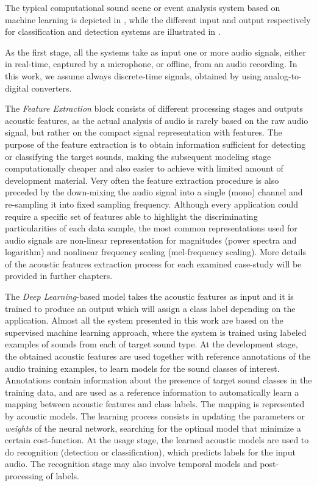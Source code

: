 The typical computational sound scene
or event analysis system based on machine learning is
depicted in , while the different input and output respectively for classification and detection systems
are illustrated in .

As the first stage, all the systems take as input one or more audio
signals, either in real-time, captured by a microphone, or offline, from an
audio recording. In this work, we assume always discrete-time signals,
obtained by using analog-to-digital converters. 

The \textit{Feature Extraction} block consists
of different processing stages and outputs acoustic features, as the actual analysis of
audio is rarely based on the raw audio signal, but rather on the compact signal
representation with features. The purpose of the feature extraction is to obtain
information sufficient for detecting or classifying the target sounds, making the
subsequent modeling stage computationally cheaper and also easier to achieve with
limited amount of development material. Very often the feature extraction procedure is also preceded by the down-mixing the audio signal into a single (mono) channel and re-sampling it into fixed sampling frequency.
Although every application could require a specific set of features able to highlight the discriminating particularities of each data sample, the most common representations used
for audio signals are non-linear representation for magnitudes (power spectra and logarithm) and nonlinear frequency scaling (mel-frequency scaling). 
More details of the acoustic features extraction process for each examined case-study will be provided in further chapters.


The \textit{Deep Learning}-based model takes the acoustic features as input and it is trained to produce an output which will assign a class label depending on the application. Almost all the system presented in this work are based on the supervised machine learning approach, where the system is trained using labeled examples of sounds from each of target sound type. 
At the development stage, the obtained acoustic features are used together with
reference annotations of the audio training examples, to learn models for the
sound classes of interest. Annotations contain information about the presence of
target sound classes in the training data, and are used as a reference information
to automatically learn a mapping between acoustic features and class labels. The
mapping is represented by acoustic models. The learning process consists in updating the parameters or \textit{weights} of the neural network, searching for the optimal model that minimize a certain cost-function. 
At the usage stage, the learned acoustic models are used to do recognition (detection or classification), which predicts labels
for the input audio. The recognition stage may also involve temporal models and
post-processing of labels.


